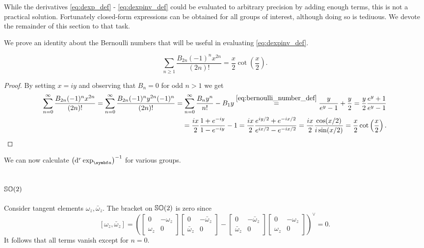 While the derivatives \eqref{eq:dexp_def} - \eqref{eq:dexpinv_def} could be evaluated to arbitrary precision by adding enough terms, this is not a practical solution. Fortunately closed-form expressions can be obtained for all groups of interest, although doing so is tediuous. We devote the remainder of this section to that task.

We prove an identity about the Bernoulli numbers that will be useful in evaluating \eqref{eq:dexpinv_def}.
\begin{proposition}
  \begin{equation}
    \label{eq:bernoulli_cot}
    \sum_{n \geq 1} \frac{B_{2n} (-1)^n x^{2n}}{(2n)!} = \frac{x}{2} \cot \left(\frac{x}{2}\right).
  \end{equation}
\end{proposition}
\begin{proof}
  By setting $x = iy$ and observing that $B_n = 0$ for odd $n > 1$ we get
  \begin{equation}
    \begin{aligned}
      \sum_{n=0}^\infty \frac{B_{2n} (-1)^n x^{2n}}{(2n)!} = \sum_{n=0}^\infty \frac{B_{2n} (-1)^n y^{2n} (-1)^n}{(2n)!} = \sum_{n=0}^\infty \frac{B_n y^n}{n!} - B_1 y \overset{\eqref{eq:bernoulli_number_def}} = \frac{y}{e^y - 1} + \frac{y}{2}
      = \frac{y}{2} \frac{e^y + 1 }{e^y - 1} \\
      = \frac{ix}{2} \frac{1 + e^{-iy}}{1 - e^{-iy}} - 1 = \frac{ix}{2} \frac{e^{iy / 2} + e^{-ix/2}}{e^{ix/2} - e^{-ix/2}} = \frac{ix}{2} \frac{\cos (x / 2)}{i \sin(x / 2)} = \frac{x}{2} \cot \left( \frac{x}{2} \right).
    \end{aligned}
  \end{equation}
\end{proof}

We can now calculate $\left( \mathrm{d}^r \exp_\a \right)^{-1}$ for various groups.

\subsection{\texorpdfstring{${\mathbb{SO}(2)}$}{SO(2)}}

Consider tangent elements $\omega_z, \bar \omega_z$. The bracket on ${\mathbb{SO}(2)}$ is zero since
\begin{equation}
  \left[ \omega_z, \bar \omega_z \right] = \left( \begin{bmatrix}
      0 & -\omega_z \\ \omega_z & 0
    \end{bmatrix}\begin{bmatrix}
      0 & -\bar \omega_z \\ \bar \omega_z & 0
    \end{bmatrix} - \begin{bmatrix}
      0 & -\bar \omega_z \\ \bar \omega_z & 0
    \end{bmatrix}\begin{bmatrix}
      0 & - \omega_z \\ \omega_z & 0
    \end{bmatrix}\right)^\vee = 0.
\end{equation}
It follows that all terms vanish except for $n = 0$.

